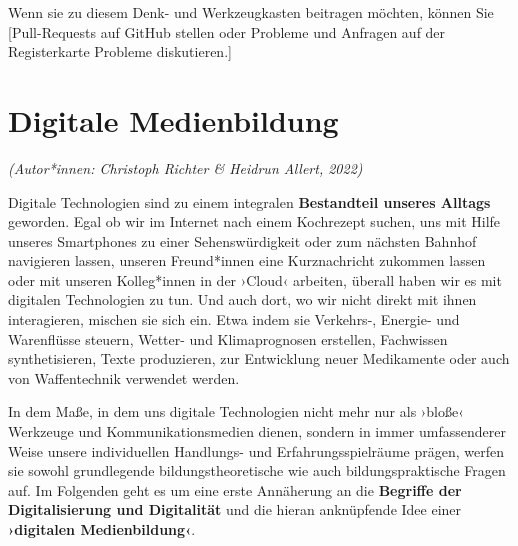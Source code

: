 \documentclass[
  a4paper,
]{book}
\begin{document}
Wenn sie zu diesem Denk- und Werkzeugkasten beitragen möchten, können Sie {[}Pull-Requests auf GitHub stellen oder Probleme und Anfragen auf der Registerkarte Probleme diskutieren.{]}

\chapter{Digitale Medienbildung}\label{digitale-medienbildung}

\emph{(Autor*innen: Christoph Richter \& Heidrun Allert, 2022)}

Digitale Technologien sind zu einem integralen \textbf{Bestandteil unseres Alltags} geworden. Egal ob wir im Internet nach einem Kochrezept suchen, uns mit Hilfe unseres Smartphones zu einer Sehenswürdigkeit oder zum nächsten Bahnhof navigieren lassen, unseren Freund*innen eine Kurznachricht zukommen lassen oder mit unseren Kolleg*innen in der ›Cloud‹ arbeiten, überall haben wir es mit digitalen Technologien zu tun. Und auch dort, wo wir nicht direkt mit ihnen interagieren, mischen sie sich ein. Etwa indem sie Verkehrs-, Energie- und Warenflüsse steuern, Wetter- und Klimaprognosen erstellen, Fachwissen synthetisieren, Texte produzieren, zur Entwicklung neuer Medikamente oder auch von Waffentechnik verwendet werden.

In dem Maße, in dem uns digitale Technologien nicht mehr nur als ›bloße‹ Werkzeuge und Kommunikationsmedien dienen, sondern in immer umfassenderer Weise unsere individuellen Handlungs- und Erfahrungsspielräume prägen, werfen sie sowohl grundlegende bildungstheoretische wie auch bildungspraktische Fragen auf. Im Folgenden geht es um eine erste Annäherung an die \textbf{Begriffe der Digitalisierung und Digitalität} und die hieran anknüpfende Idee einer \textbf{›digitalen Medienbildung‹}.
\end{document}
